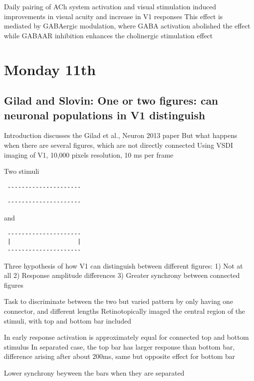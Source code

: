 \documentclass[11pt]{Science}
\begin{document}
Daily pairing of ACh system activation and visual stimulation induced improvements in visual acuity and increase in V1 responses
This effect is mediated by GABAergic modulation, where GABA activation abolished the effect while GABAAR inhibition enhances the cholinergic stimulation effect


\section{Monday 11th}
\label{sec-2}


\subsection{Gilad and Slovin: One or two figures: can neuronal populations in V1 distinguish}
\label{sec-2.1}


Introduction discusses the Gilad et al., Neuron 2013 paper
But what happens when there are several figures, which are not directly connected
Using VSDI imaging of V1, 10,000 pixels resolution, 10 ms per frame

Two stimuli

\begin{verbatim}
 ---------------------
\end{verbatim}


\begin{verbatim}
 ---------------------
\end{verbatim}


and

\begin{verbatim}
 ---------------------
 |                   |
 ---------------------
\end{verbatim}


Three hypothesis of how V1 can distinguish between different figures: 1) Not at all 2) Response amplitude differences 3) Greater synchrony between connected figures

Task to discriminate between the two but varied pattern by only having one connector, and different lengths
Retinotopically imaged the central region of the stimuli, with top and bottom bar included

In early response activation is approximately equal for connected top and bottom stimulus
In separated case, the top bar has larger response than bottom bar, difference arising after about 200ms, same but opposite effect for bottom bar

Lower synchrony beyween the bars when they are separated
\end{document}
